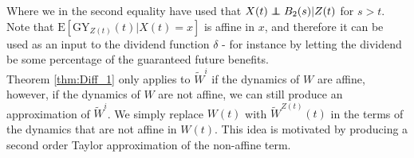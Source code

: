 \documentclass[12pt]{article}
\newcommand{\E}{\text{E}}
\newcommand{\indic}[1]{\mathds{1}_{ \{ #1 \} }}
\newcommand\independent{\protect\mathpalette{\protect\independenT}{\perp}}
\def\independenT#1#2{\mathrel{\rlap{$#1#2$}\mkern2mu{#1#2}}}
\theoremstyle{my_thm}
\begin{document}
Where we in the second equality have used that $X(t)\independent B_2(s)|Z(t)$ for $s>t$. Note that $\E[\text{GY}_{Z(t)}(t)|X(t)=x]$ is affine in $x$, and therefore it can be used as an input to the dividend function $\delta$ - for instance by letting the dividend be some percentage of the guaranteed future benefits.
\\[12pt]
Theorem \ref{thm:Diff_1} only applies to $\tilde{W}^i$ if the dynamics of $W$ are affine, however, if the dynamics of $W$ are not affine, we can still produce an approximation of $\tilde{W}^i$. We simply replace $W(t)$ with $\tilde{W}^{Z(t)}(t)$ in the terms of the dynamics that are not affine in $W(t)$. This idea is motivated by producing a second order Taylor approximation of the non-affine term.





\iffalse
We are interested in $\tilde{W}^i(t)$ for $i \in \mathcal{J}$, noting that the relation between $\tilde{W}^i$ and $\E_0[W(t)]$ is given by
\begin{align*}
\E_0[W(t)] =&
\sum_{i:i\in \mathcal{J}} \tilde{W}^i(t).
\end{align*}


We can even calculate the present value of all future benefits including bonus
\begin{align*}
\text{G}_i(t)=&\E \left[ \int_t^n e^{-\int_t^s r} d \left( B_1(s)+\frac{X(s)-V_1^{Z(s)*}(s)}{V_2^{Z(s)*}(s)}B_2(s) \right) \big|Z(t)=i \right]
\\
=&
\int_t^n e^{-\int_t^s r} \sum_{j:j \in \mathcal{J}} p_{ij}(t,s) \left( b_1^j(s)+ \sum_{k:k\neq j} \mu^{jk}(s) b^{jk}(s)  \right) ds
\\
&+
\int_t^n e^{-\int_t^s r} \sum_{j:j \in \mathcal{J}} p_{ij}(t,s) \frac{\E[X(s)|Z(s)=j,Z(t)=i]-V_1^{j*}(s)}{V_2^{j*}(s)}\left( b_1^j(s)+ \sum_{k:k\neq j} \mu^{jk}(s) b^{jk}(s)  \right) ds
\end{align*}
by using that $\E[X(s)|Z(s)=j,Z(t)=i]=\frac{\tilde{X}^j(s)}{p_{ij}(t,s)p{0i}(0,t)}$.
\fi
\end{document}
